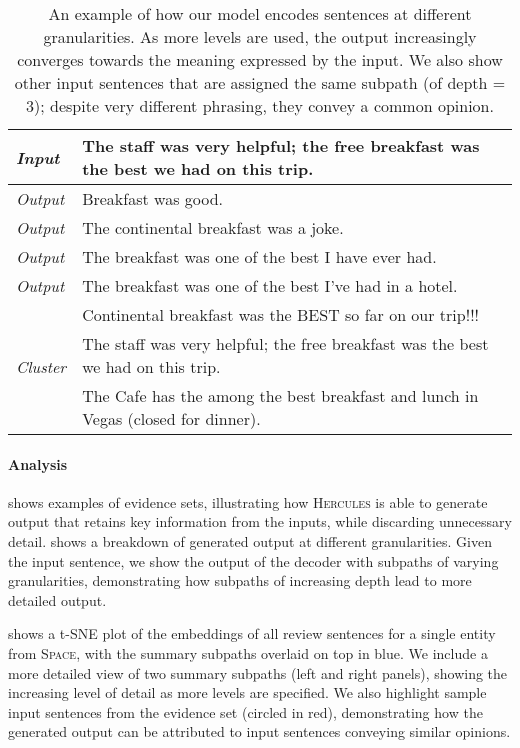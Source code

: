 \documentclass[11pt]{article}
\begin{document}
\begin{table}[t]
\centering
    \small
    \begin{tabular}{@{}m{2cm}@{~}|@{~}m{5.3cm}@{}}
\hline\hline
    \textit{Input} & The staff was very helpful; the free breakfast was the best we had on this trip. \\
    \hline
\textit{Output } & Breakfast was good. \\
    \textit{Output } & The continental breakfast was a joke. \\    
    \textit{Output } & The breakfast was one of the best I have ever had. \\
    \textit{Output } & The breakfast was one of the best I've had in a hotel. \\
\hline
    \multirow{7}{*}{\textit{Cluster }} &
    Continental breakfast was the BEST so far on our trip!!! \\
& The staff was very helpful; the free breakfast was the best we had on this trip. \\
& The Cafe has the among the best breakfast and lunch in Vegas (closed for dinner). \\
\hline\hline
        \end{tabular}
        \vspace{-.1cm}
    \caption{An example of how our model encodes sentences at different granularities. As more levels are used, the output increasingly converges towards the meaning expressed by the input. We also show other input sentences that are assigned the same subpath (of depth = 3); despite very different phrasing, they convey a common opinion.}
    \vspace{-.2cm}
    \label{tab:analysis}
\end{table}

\paragraph{Analysis}

 shows examples of evidence sets, illustrating how \textsc{Hercules} is able to generate output that retains key information from the inputs, while discarding unnecessary detail.  shows a breakdown of generated output at different granularities. Given the input sentence, we show the output of the decoder with subpaths of varying granularities, demonstrating how subpaths of increasing depth lead to more detailed output.

 shows a t-SNE \cite{tsne} plot of the embeddings of all review sentences for a single entity from \textsc{Space}, with the summary subpaths overlaid on top in blue. We include a more detailed view of two summary subpaths (left and right panels), showing the increasing level of detail as more levels are specified. We also highlight sample input sentences from the evidence set (circled in red), demonstrating how the generated output can be attributed to input sentences conveying similar opinions.
\end{document}
